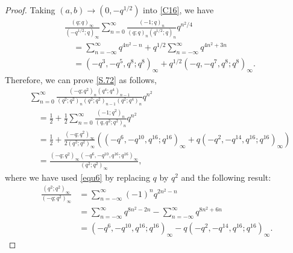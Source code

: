 \documentclass[reqno,12pt]{amsart}
\theoremstyle{remark}
\numberwithin{equation}{section}
\begin{document}
\begin{proof}
Taking $\left(a,b\right)\to\left(0,-q^{1/2}\right)$ into \eqref{C16}, we have
\begin{align}
&\frac{\left(q;q\right)_{\infty}}{\left(-q^{1/2};q\right)_{\infty}}
\sum_{n=0}^{\infty}
\frac{\left(-1;q\right)_n}
{\left(q;q\right)_n\left(q^{1/2};q\right)_n}q^{{n^2}/{4}}\nonumber\\
&\quad=
\sum_{n=-\infty}^{\infty}q^{4n^2-n}
+q^{{1}/{2}}\sum_{n=-\infty}^{\infty}q^{4n^2+3n}\nonumber\\
&\quad
=\left(-q^3,-q^{5},q^{8};q^{8}\right)_{\infty}
+q^{{1}/{2}}\left(-q,-q^{7},q^{8};q^{8}\right)_{\infty}.
\label{equ6}
\end{align}
Therefore, we can prove \eqref{S.72} as follows,
\begin{align*}
&\sum_{n=0}^{\infty}\frac{\left(-q;q^2\right)_{n}\left(q^4;q^4\right)_{n-1}}
{\left(q^2;q^2\right)_n\left(q^2;q^2\right)_{n-1}\left(q^2;q^4\right)_n}q^{n^2}\\
&\quad=\frac{1}{2}+\frac{1}{2}
\sum_{n=0}^{\infty}\frac{\left(-1;q^2\right)_n}{\left(q,q^2;q^2\right)_n}q^{n^2}\\
&\quad=\frac{1}{2}+\frac{
\left(-q;q^2\right)_{\infty}
}
{2\left(q^2;q^2\right)_{\infty}}\left(\left(-q^6,-q^{10},q^{16};q^{16}\right)_{\infty}
+q\left(-q^2,-q^{14},q^{16};q^{16}\right)_{\infty}\right)\\
&\quad=\frac{\left(-q;q^2\right)_{\infty}\left(-q^6,-q^{10},q^{16};q^{16}\right)_{\infty}
}
{\left(q^2;q^2\right)_{\infty}},
\end{align*}
where we have used \eqref{equ6} by replacing $q$ by $q^2$ and the following result:
\begin{align*}
\frac{\left(q^2;q^2\right)_{\infty}}{\left(-q;q^2\right)_{\infty}}
&=\sum_{n=-\infty}^{\infty}\left(-1\right)^nq^{2n^2-n}\\
&=\sum_{n=-\infty}^{\infty}q^{8n^2-2n}-
\sum_{n=-\infty}^{\infty}q^{8n^2+6n}\\
&=\left(-q^6,-q^{10},q^{16};q^{16}\right)_{\infty}
-q\left(-q^2,-q^{14},q^{16};q^{16}\right)_{\infty}.
\end{align*}
\end{proof}
\end{document}
